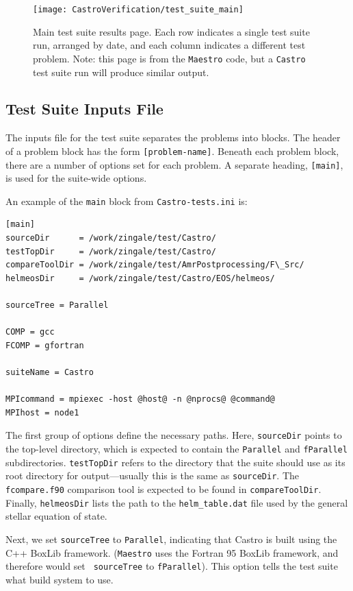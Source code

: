\begin{figure}[t]
\centering
\texttt{[image: CastroVerification/test\_suite\_main]}
\caption{\label{fig:test_suite_main} Main test suite results page.  Each 
row indicates a single test suite run, arranged by date, and each column
indicates a different test problem.  Note: this page is from the {\tt Maestro}
code, but a {\tt Castro} test suite run will produce similar output.}
\end{figure}

\subsection{Test Suite Inputs File}

The inputs file for the test suite separates the problems into blocks.
The header of a problem block has the form {\tt [problem-name]}.
Beneath each problem block, there are a number of options set for each
problem.  A separate heading, {\tt [main]}, is used for the suite-wide
options.

An example of the {\tt main} block from {\tt Castro-tests.ini} is:
\begin{verbatim}
[main]
sourceDir      = /work/zingale/test/Castro/
testTopDir     = /work/zingale/test/Castro/
compareToolDir = /work/zingale/test/AmrPostprocessing/F\_Src/
helmeosDir     = /work/zingale/test/Castro/EOS/helmeos/

sourceTree = Parallel

COMP = gcc
FCOMP = gfortran

suiteName = Castro

MPIcommand = mpiexec -host @host@ -n @nprocs@ @command@
MPIhost = node1
\end{verbatim}

The first group of options define the necessary paths.
Here, {\tt sourceDir} points to the top-level directory, which is
expected to contain the {\tt Parallel} and {\tt fParallel} subdirectories.
{\tt testTopDir} refers to the directory that the suite should use as
its root directory for output---usually this is the same as {\tt sourceDir}.
The {\tt fcompare.f90} comparison tool is expected to be found in
{\tt compareToolDir}.  Finally, {\tt helmeosDir} lists the path to the
{\tt helm\_table.dat} file used by the general stellar equation of state.

Next, we set {\tt sourceTree} to {\tt Parallel}, indicating that
Castro is built using the C++ BoxLib framework.  ({\tt Maestro} uses
the Fortran 95 BoxLib framework, and therefore would set {\tt
  sourceTree} to {\tt fParallel}).  This option tells the test suite
what build system to use.

